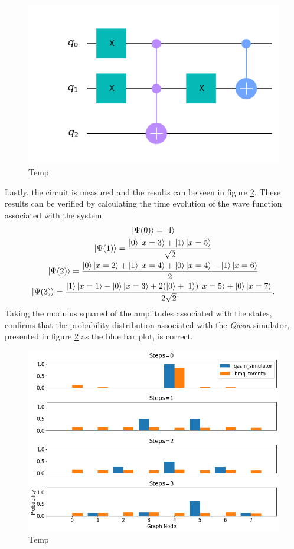 \documentclass[../../dissertation.tex]{subfiles}
\begin{document}
\begin{figure}[!h]
	\centering
	\includegraphics[scale=0.32]{img/Qiskit/CoinedQuantumWalk/Circuits/circDecr_N3_S3.png}
	\caption{Temp} 
	\label{fig:decrCircuitQistkit}
\end{figure}
Lastly, the circuit is measured and the results can be seen in figure \ref{fig:coinedQWQiskitDist}. These results can be verified by calculating the time evolution of the wave function associated with the system
\begin{gather}
	\ket{\Psi(0)} = \ket{4}\\
	\ket{\Psi(1)} = \frac{\ket{0}\ket{x=3}+\ket{1}\ket{x=5}}{\sqrt{2}} \\
	\ket{\Psi(2)} = \frac{\ket{0}\ket{x=2}+\ket{1}\ket{x=4}+\ket{0}\ket{x=4}-\ket{1}\ket{x=6}}{2}\\
	\ket{\Psi(3)} = \frac{\ket{1}\ket{x=1}-\ket{0}\ket{x=3}+2(\ket{0}+\ket{1})\ket{x=5}+\ket{0}\ket{x=7}}{2\sqrt{2}}.
\end{gather}
Taking the modulus squared of the amplitudes associated with the states, confirms that the probability distribution associated with the \textit{Qasm} simulator, presented in figure \ref{fig:coinedQWQiskitDist} as the blue bar plot, is correct. 
\begin{figure}[!h]
	\centering
	\includegraphics[scale=0.40]{img/Qiskit/CoinedQuantumWalk/CoinedQW_N3_S0123.png}
	\caption{Temp} 
	\label{fig:coinedQWQiskitDist}
\end{figure}
\end{document}
